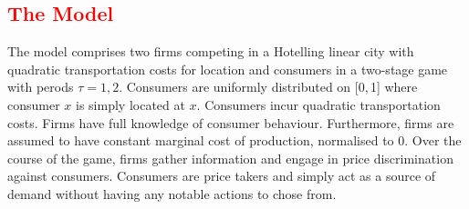 \documentclass[a4paper, 11 pt, fleqn]{article}
\begin{document}
\subsection{\textcolor{red}{The Model}} \label{sec:choe-baseline} %
The model comprises two firms competing in a Hotelling linear city with quadratic transportation costs for location and consumers in a two-stage game
with perods $\tau = 1,2$. Consumers are uniformly distributed on [0,\,1] where consumer $x$ is simply located at $x$.
Consumers incur quadratic transportation costs. Firms have full knowledge of consumer behaviour. Furthermore, firms are assumed to have constant
marginal cost of production, normalised to 0. Over the course of the game, firms gather information and engage in price discrimination
against consumers. Consumers are price takers and simply act as a source of demand without having any notable actions to chose from.
%
\end{document}
